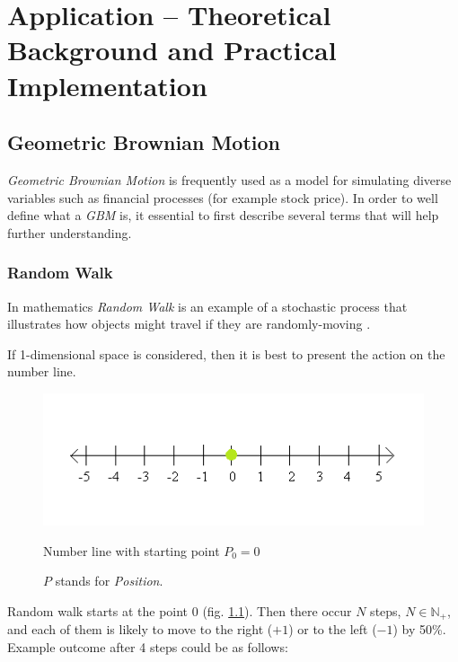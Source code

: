 \chapter{Application -- Theoretical Background and Practical Implementation}

\section{Geometric Brownian Motion}
    \textit{Geometric Brownian Motion} is frequently used as a model for simulating diverse variables such as financial processes (for example stock price). In order to well define what a \textit{GBM} is, it essential to first describe several terms that will help further understanding.
    
    \subsection{Random Walk}
        In mathematics \textit{Random Walk} is an example of a stochastic process that illustrates how objects might travel if they are randomly-moving \cite{randomWalk}.
        
        If 1-dimensional space is considered, then it is best to present the action on the number line.
        \begin{figure}[H]
            \centering
            \includegraphics{img/numberLine.png}
            \caption{Number line with starting point $P_0=0$}
            \caption*{$P$ stands for \textit{Position}.}
            \label{fig:numberLine_start}
        \end{figure}
        
        Random walk starts at the point 0 (fig. \ref{fig:numberLine_start}). Then there occur $N$ steps, $N \in \mathbb{N}_+$, and each of them is likely to move to the right ($+1$) or to the left ($-1$) by 50\%. Example outcome after 4 steps could be as follows:
        
